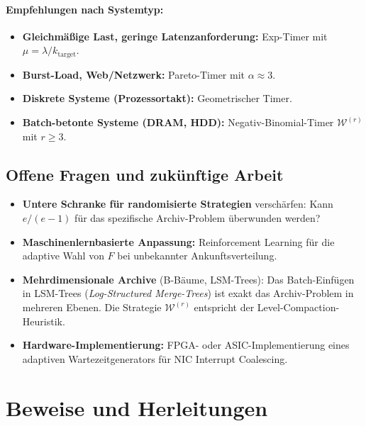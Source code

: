 ﻿\documentclass[12pt, a4paper]{article}
\begin{document}
\paragraph{Empfehlungen nach Systemtyp:}
\begin{itemize}[noitemsep]
  \item \textbf{Gleichmäßige Last, geringe Latenzanforderung:}
        Exp-Timer mit $\mu = \lambda/k_{\mathrm{target}}$.
  \item \textbf{Burst-Load, Web/Netzwerk:}
        Pareto-Timer mit $\alpha \approx 3$.
  \item \textbf{Diskrete Systeme (Prozessortakt):}
        Geometrischer Timer.
  \item \textbf{Batch-betonte Systeme (DRAM, HDD):}
        Negativ-Binomial-Timer $\mathcal{W}^{(r)}$ mit $r \geq 3$.
\end{itemize}

\subsection{Offene Fragen und zukünftige Arbeit}

\begin{itemize}[noitemsep]
  \item \textbf{Untere Schranke für randomisierte Strategien} verschärfen:
        Kann $e/(e-1)$ für das spezifische Archiv-Problem überwunden werden?
  \item \textbf{Maschinenlernbasierte Anpassung:} Reinforcement Learning für
        die adaptive Wahl von $F$ bei unbekannter Ankunftsverteilung.
  \item \textbf{Mehrdimensionale Archive} (B-Bäume, LSM-Trees): Das
        Batch-Einfügen in LSM-Trees (\emph{Log-Structured Merge-Trees}) ist
        exakt das Archiv-Problem in mehreren Ebenen. Die Strategie
        $\mathcal{W}^{(r)}$ entspricht der Level-Compaction-Heuristik.
  \item \textbf{Hardware-Implementierung:} FPGA- oder ASIC-Implementierung
        eines adaptiven Wartezeitgenerators für NIC Interrupt Coalescing.
\end{itemize}

\appendix

\section{Beweise und Herleitungen}\label{app:proofs}
\end{document}
